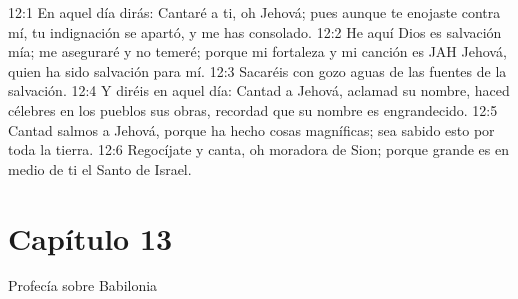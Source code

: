 12:1 En aquel día dirás: Cantaré a ti, oh Jehová; pues aunque te enojaste contra mí, tu indignación se apartó, y me has consolado. 
12:2 He aquí Dios es salvación mía; me aseguraré y no temeré; porque mi fortaleza y mi canción es JAH Jehová, quien ha sido salvación para mí. 
12:3 Sacaréis con gozo aguas de las fuentes de la salvación. 
12:4 Y diréis en aquel día: Cantad a Jehová, aclamad su nombre, haced célebres en los pueblos sus obras, recordad que su nombre es engrandecido. 
12:5 Cantad salmos a Jehová, porque ha hecho cosas magníficas; sea sabido esto por toda la tierra. 
12:6 Regocíjate y canta, oh moradora de Sion; porque grande es en medio de ti el Santo de Israel. 
\section*{Capítulo 13}
Profecía sobre Babilonia 
 
